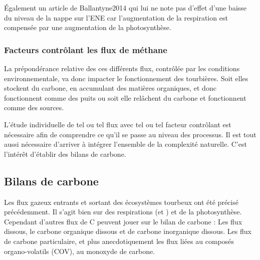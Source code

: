 Également un article de Ballantyne2014 qui lui ne note pas d'effet d'une baisse du niveau de la nappe sur l'ENE car l'augmentation de la respiration est compensée par une augmentation de la photosynthèse.

\subsubsection{Facteurs contrôlant les flux de méthane}




La prépondérance relative des ces différents flux, contrôlée par les conditions environnementale, va donc impacter le fonctionnement des tourbières. 
Soit elles stockent du carbone, en accumulant des matières organiques, et donc fonctionnent comme des puits ou soit elle relâchent du carbone et fonctionnent comme des sources.


L'étude individuelle de tel ou tel flux avec tel ou tel facteur contrôlant est nécessaire afin de comprendre ce qu'il se passe au niveau des processus.
Il est tout aussi nécessaire d'arriver à intégrer l'ensemble de la complexité naturelle.
C'est l'intérêt d'établir des bilans de carbone.

\subsection{Bilans de carbone}

Les flux gazeux entrants et sortant des écosystèmes tourbeux ont été précisé précédemment.
Il s'agit bien sur des respirations (\COO et \CHH) et de la photosynthèse.
Cependant d'autres flux de C peuvent jouer sur le bilan de carbone : 
Les flux dissous, le carbone organique dissous et de carbone inorganique dissous.
Les flux de carbone particulaire, et plus anecdotiquement les flux liées au composés organo-volatils (COV), au monoxyde de carbone.

